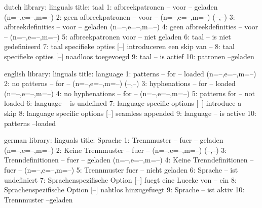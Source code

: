 



\unprotect

\startmessages  dutch  library: linguals
  title: taal
      1: afbreekpatronen -- voor -- geladen (n=--,e=--,m=--)
      2: geen afbreekpatronen -- voor -- (n=--,e=--,m=--) (--,--)
      3: afbreekdefinities -- voor -- geladen (n=--,e=--,m=--)
      4: geen afbreekdefinities -- voor -- (n=--,e=--,m=--)
      5: afbreekpatronen voor -- niet geladen
      6: taal -- is niet gedefinieerd
      7: taal specifieke opties [--] introduceren een skip van --
      8: taal specifieke opties [--] naadloos toegevoegd
      9: taal -- is actief
     10: patronen --geladen
\stopmessages

\startmessages  english  library: linguals
  title: language
      1: patterns -- for -- loaded (n=--,e=--,m=--)
      2: no patterns -- for -- (n=--,e=--,m=--) (--,--)
      3: hyphenations -- for -- loaded (n=--,e=--,m=--)
      4: no hyphenations -- for -- (n=--,e=--,m=--)
      5: patterns for -- not loaded
      6: language -- is undefined
      7: language specific options [--] introduce a -- skip
      8: language specific options [--] seamless appended
      9: language -- is active
     10: patterns --loaded
\stopmessages

\startmessages  german  library: linguals
  title: Sprache
      1: Trennmuster -- fuer -- geladen (n=--,e=--,m=--)
      2: Keine Trennmuster -- fuer -- (n=--,e=--,m=--) (--,--)
      3: Trenndefinitionen -- fuer -- geladen (n=--,e=--,m=--)
      4: Keine Trenndefinitionen -- fuer -- (n=--,e=--,m=--)
      5: Trennmuster fuer -- nicht geladen
      6: Sprache -- ist undefiniert
      7: Sprachenspezifische Option [--] fuegt eine Luecke von -- ein
      8: Sprachenspezifische Option [--] nahtlos hinzugefuegt
      9: Sprache -- ist aktiv
     10: Trennmuster --geladen
\stopmessages

